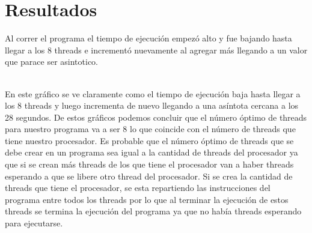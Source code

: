 \documentclass[12pt,a4paper]{article}
\begin{document}
\section{Resultados}
Al correr el programa el tiempo de ejecución empezó alto y fue bajando hasta llegar
a los 8 threads e incrementó nuevamente al agregar más llegando a un valor que parace ser asintotico.
\\

\\
En este gráfico se ve claramente como el tiempo de ejecución baja hasta llegar a
los 8 threads y luego incrementa de nuevo llegando a una asíntota cercana a los 28 segundos.
De estos gráficos podemos concluir que el número óptimo de threads para nuestro programa va a ser
8 lo que coincide con el número de threads que tiene nuestro procesador. Es probable que el número óptimo de
threads que se debe crear en un programa sea igual a la cantidad de threads del procesador ya que si se crean más
threads de los que tiene el procesador van a haber threads esperando a que se libere otro thread del procesador. Si se crea
la cantidad de threads que tiene el procesador, se esta repartiendo las instrucciones del programa entre todos los threads
por lo que al terminar la ejecución de estos threads se termina la ejecución del programa ya que no había threads esperando
para ejecutarse.
\end{document}
